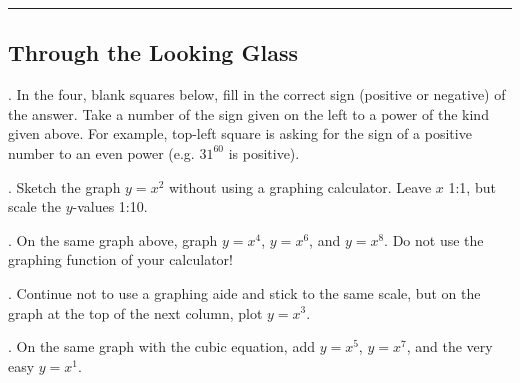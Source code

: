 \renewcommand{\columnseprule}{1.5pt}
\begin{multicols*}{2}
\noindent
\rule[0.5\baselineskip]{0.5\textwidth}{1pt}
\noindent
\subsection{Through the Looking Glass}
. In the four, blank squares below, fill in the correct sign (positive or negative) of the answer.
Take a number of the sign given on the left to a power of the kind given above.  For example, 
top-left square is asking for the sign of a positive number to an even power (e.g. $31^{60}$ is positive).

\noindent
{}

\vspace{0.2cm}

. Sketch the graph $y=x^2$ without using a graphing calculator.  Leave $x$ 1:1, but scale 
the $y$-values 1:10.

\noindent
\begin{centering}
\end{centering}

\vspace{0.2cm}

. On the same graph above, graph $y=x^4$, $y=x^6$, and $y=x^8$.  Do not use the graphing
function of your calculator!

\vspace{0.2cm}

. Continue not to use a graphing aide and stick to the same scale, but on the graph at the top of the next column, plot $y=x^3$.
 
\vspace{0.2cm}

. On the same graph with the cubic equation, add $y=x^5$, $y=x^7$, and the very
easy $y=x^1$.


\end{multicols*}
